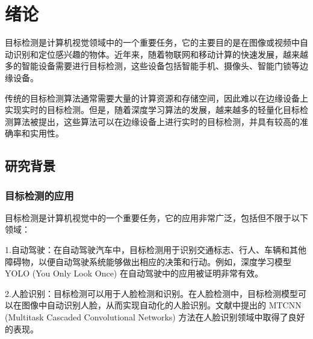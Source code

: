 \documentclass{ctexart}
\numberwithin{equation}{section}%
\numberwithin{figure}{section}%
\numberwithin{table}{section}%
\begin{document}
	\newpage
	\tableofcontents
	\newpage
	\setcounter{page}{1}
	\songti{}
	\section{绪论}
	目标检测是计算机视觉领域中的一个重要任务，它的主要目的是在图像或视频中自动识别和定位感兴趣的物体。近年来，随着物联网和移动计算的快速发展，越来越多的智能设备需要进行目标检测，这些设备包括智能手机、摄像头、智能门锁等边缘设备。
	
	
	传统的目标检测算法通常需要大量的计算资源和存储空间，因此难以在边缘设备上实现实时的目标检测。但是，随着深度学习算法的发展，越来越多的轻量化目标检测算法被提出，这些算法可以在边缘设备上进行实时的目标检测，并具有较高的准确率和实用性。
	
%	
%
	\subsection{研究背景}
	\subsubsection{目标检测的应用}
	目标检测是计算机视觉中的一个重要任务，它的应用非常广泛，包括但不限于以下领域：
	
	1.自动驾驶：在自动驾驶汽车中，目标检测用于识别交通标志、行人、车辆和其他障碍物，以便自动驾驶系统能够做出相应的决策和行动。例如，深度学习模型 YOLO (You Only Look Once) 在自动驾驶中的应用被证明非常有效\textsuperscript{\cite{1}}。
	
	2.人脸识别：目标检测可以用于人脸检测和识别。在人脸检测中，目标检测模型可以在图像中自动识别人脸，从而实现自动化的人脸识别。文献\textsuperscript{\cite{2}}中提出的 MTCNN (Multitask Cascaded Convolutional Networks) 方法在人脸识别领域中取得了良好的表现。
	
\end{document}
